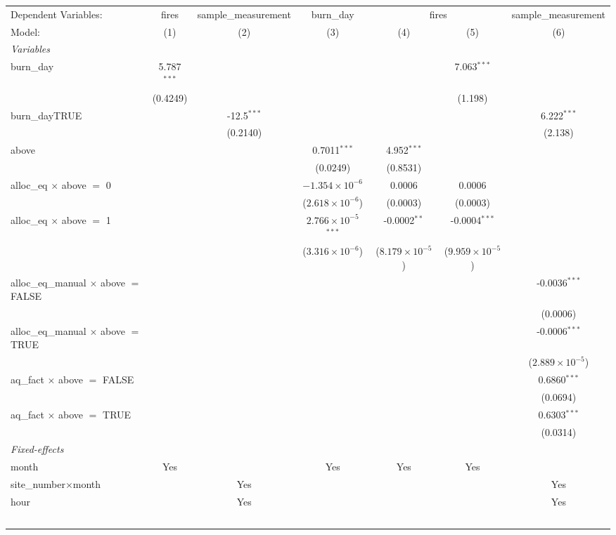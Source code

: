 \begin{tabular}{lcccccc}
\tabularnewline\midrule\midrule
Dependent Variables:&fires&sample\_measurement&burn\_day&\multicolumn{2}{c}{fires}&sample\_measurement\\
Model:&(1) & (2) & (3) & (4) & (5) & (6)\\
\midrule \emph{Variables}&   &   &   &   &   &  \\
burn\_day&5.787$^{***}$ &    &    &    & 7.063$^{***}$ &   \\
  &(0.4249) &    &    &    & (1.198) &   \\
burn\_dayTRUE&   & -12.5$^{***}$ &    &    &    & 6.222$^{***}$\\
  &   & (0.2140) &    &    &    & (2.138)\\
above&   &    & 0.7011$^{***}$ & 4.952$^{***}$ &    &   \\
  &   &    & (0.0249) & (0.8531) &    &   \\
alloc\_eq $\times $ above $=$ 0&   &    & $-1.354\times 10^{-6}$ & 0.0006 & 0.0006 &   \\
  &   &    & ($2.618\times 10^{-6}$) & (0.0003) & (0.0003) &   \\
alloc\_eq $\times $ above $=$ 1&   &    & $2.766\times 10^{-5}$$^{***}$ & -0.0002$^{**}$ & -0.0004$^{***}$ &   \\
  &   &    & ($3.316\times 10^{-6}$) & ($8.179\times 10^{-5}$) & ($9.959\times 10^{-5}$) &   \\
alloc\_eq\_manual $\times $ above $=$ FALSE&   &    &    &    &    & -0.0036$^{***}$\\
  &   &    &    &    &    & (0.0006)\\
alloc\_eq\_manual $\times $ above $=$ TRUE&   &    &    &    &    & -0.0006$^{***}$\\
  &   &    &    &    &    & ($2.889\times 10^{-5}$)\\
aq\_fact $\times $ above $=$ FALSE&   &    &    &    &    & 0.6860$^{***}$\\
  &   &    &    &    &    & (0.0694)\\
aq\_fact $\times $ above $=$ TRUE&   &    &    &    &    & 0.6303$^{***}$\\
  &   &    &    &    &    & (0.0314)\\
\midrule \emph{Fixed-effects}&   &   &   &   &   &  \\
month & Yes &  & Yes & Yes & Yes & \\
site\_number$\times$month &  & Yes &  &  &  & Yes\\
hour &  & Yes &  &  &  & Yes\\
$$
\end{tabular}

